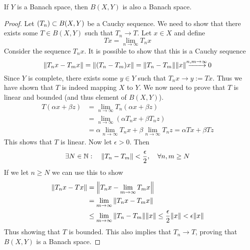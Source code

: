 \documentclass[../../script.tex]{subfiles}
\begin{document}
\begin{thm}
    If $Y$ is a Banach space, then $B(X, Y)$ is also a Banach space.
\end{thm}
\begin{proof}
    Let $\anyseqdef[T]{B(X, Y)}$ be a Cauchy sequence. We need to show that there exists some $T \in B(X, Y)$ such that $T_n \rightarrow T$.
    Let $x \in X$ and define 
    \begin{equation}
        Tx = \lim_{n \rightarrow \infty} T_n x
    \end{equation}
    Consider the sequence $T_n x$. It is possible to show that this is a Cauchy sequence 
    \begin{equation}
        \norm{T_n x - T_m x} = \norm{(T_n - T_m) x} = \norm{T_n - T_m} \norm{x} \conv{n,m \rightarrow \infty} 0
    \end{equation}
    Since $Y$ is complete, there exists some $y \in Y$ such that $T_n x \rightarrow y := Tx$. Thus we have shown that $T$ is indeed mapping $X$ to $Y$.
    We now need to prove that $T$ is linear and bounded (and thus element of $B(X, Y)$). 
    \begin{equation}
        \begin{split}
            T(\alpha x + \beta z) &= \lim_{n \rightarrow \infty} T_n(\alpha x + \beta z) \\
            &= \lim_{n \rightarrow \infty} (\alpha T_n x + \beta T_n z) \\
            &= \alpha \lim_{n \rightarrow \infty} T_n x + \beta \lim_{n \rightarrow \infty} T_n z = \alpha Tx + \beta Tz
        \end{split}
    \end{equation}
    This shows that $T$ is linear. Now let $\epsilon > 0$. Then 
    \begin{equation}
        \exists N \in \natn: \quad \norm{T_n - T_m} < \frac{\epsilon}{2}, \quad \forall n, m \ge N
    \end{equation}
    If we let $n \ge N$ we can use this to show 
    \begin{equation}
        \begin{split}
            \norm{T_n x - Tx} &= \norm{T_n x - \lim_{m \rightarrow \infty} T_m x} \\
            &= \lim_{m \rightarrow \infty} \norm{T_n x - T_m x} \\
            &\le \lim_{m \rightarrow \infty} \norm{T_n - T_m} \norm{x} \le \frac{\epsilon}{2} \norm{x} < \epsilon \norm{x}
        \end{split}
    \end{equation}
    Thus showing that $T$ is bounded. This also implies that $T_n \rightarrow T$, proving that $B(X, Y)$ is a Banach space.
\end{proof}
\end{document}
